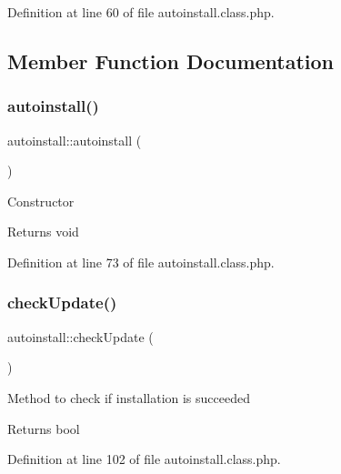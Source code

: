 Definition at line 60 of file autoinstall.\+class.\+php.



\subsection{Member Function Documentation}
\hypertarget{classautoinstall_aa76d5fcbf6ac9450b810acefa4b85a51}{}\label{classautoinstall_aa76d5fcbf6ac9450b810acefa4b85a51} 
\subsubsection{\texorpdfstring{autoinstall()}{autoinstall()}}
{\footnotesize\ttfamily autoinstall\+::autoinstall (\begin{DoxyParamCaption}{ }\end{DoxyParamCaption})}

Constructor

\begin{DoxyReturn}{Returns}
void 
\end{DoxyReturn}


Definition at line 73 of file autoinstall.\+class.\+php.

\hypertarget{classautoinstall_a74f260b0d1254c8e4dbd69b532072a95}{}\label{classautoinstall_a74f260b0d1254c8e4dbd69b532072a95} 
\subsubsection{\texorpdfstring{check\+Update()}{checkUpdate()}}
{\footnotesize\ttfamily autoinstall\+::check\+Update (\begin{DoxyParamCaption}{ }\end{DoxyParamCaption})}

Method to check if installation is succeeded

\begin{DoxyReturn}{Returns}
bool 
\end{DoxyReturn}


Definition at line 102 of file autoinstall.\+class.\+php.

\hypertarget{classautoinstall_ad783aa6031577dca5fdcc7f6ea61f452}{}\label{classautoinstall_ad783aa6031577dca5fdcc7f6ea61f452} 
